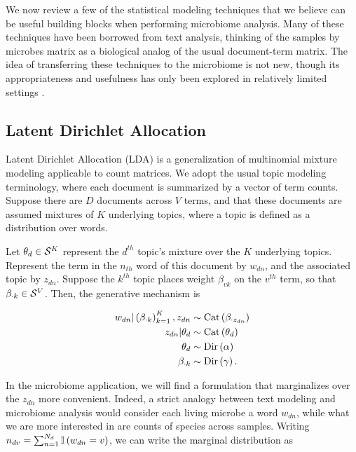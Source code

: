 \documentclass[oupdraft]{bio}
\begin{document}
We now review a few of the statistical modeling techniques that we believe can
be useful building blocks when performing microbiome analysis. Many of these
techniques have been borrowed from text analysis, thinking of the samples by
microbes matrix as a biological analog of the usual document-term matrix. The
idea of transferring these techniques to the microbiome is not new, though its
appropriateness and usefulness has only been explored in relatively limited
settings \citep{shafiei2015biomico, chen2012estimating, holmes2012dirichlet,
  chen2013variable}.

\subsection{Latent Dirichlet Allocation}

Latent Dirichlet Allocation (LDA) is a generalization of multinomial mixture
modeling applicable to count matrices. We adopt the usual topic modeling
terminology, where each document is summarized by a vector of term counts.
Suppose there are $D$ documents across $V$ terms, and that these documents are
assumed mixtures of $K$ underlying topics, where a topic is defined as a
distribution over words.

Let $\theta_{d} \in \mathcal{S}^{K}$ represent the $d^{th}$ topic's mixture over the
$K$ underlying topics. Represent the term in the $n_{th}$ word of this document
by $w_{dn}$, and the associated topic by $z_{dn}$. Suppose the $k^{th}$ topic
places weight $\beta_{vk}$ on the $v^{th}$ term, so that $\beta_{\cdot k} \in
\mathcal{S}^{V}$. Then, the generative mechanism is

\begin{align*}
w_{dn} \vert \left(\beta_{\cdot k}\right)_{k = 1}^{K}, z_{dn} &\sim \textnormal{Cat}\left(\beta_{\cdot z_{dn}}\right) \\
z_{dn} \vert \theta_{d} &\sim \textnormal{Cat}\left(\theta_{d}\right) \\
\theta_{d} &\sim \textnormal{Dir}\left(\alpha\right) \\
\beta_{\cdot k} &\sim \textnormal{Dir}\left(\gamma\right).
\end{align*}


In the microbiome application, we will find a formulation that marginalizes over
the $z_{dn}$ more convenient. Indeed, a strict analogy between text modeling and
microbiome analysis would consider each living microbe a word $w_{dn}$, while
what we are more interested in are counts of species across samples.
Writing $n_{dv} = \sum_{n = 1}^{N_{d}} \mathbb{I}\left({w_{dn} = v}\right)$, we can write the
marginal distribution as
\end{document}
